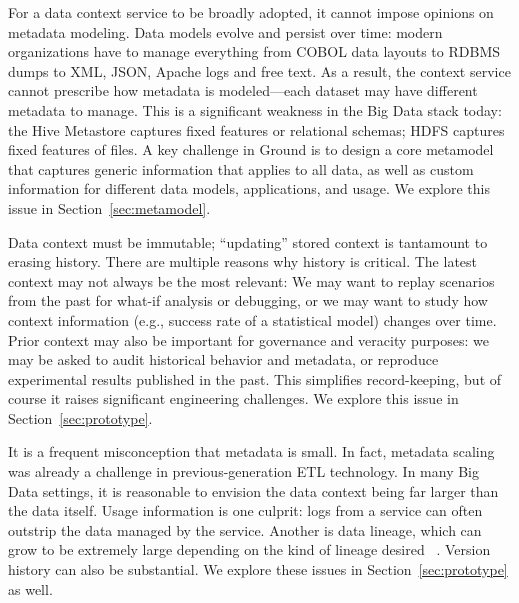 \documentclass{sig-alternate}
\begin{document}
 For a data context service to be broadly adopted, it cannot impose opinions on metadata modeling. 
Data models evolve and persist over time: modern organizations have to manage everything from COBOL data layouts to RDBMS dumps to XML, JSON, Apache logs and free text. 
As a result, the context service cannot prescribe how metadata is modeled---each dataset may have different metadata to manage. 
This is a significant weakness in the Big Data stack today: the Hive Metastore captures fixed features or relational schemas; HDFS captures fixed features of files.  
A key challenge in Ground is to design a core metamodel that captures generic information that applies to all data, as well as custom information for different data models, applications, and usage.
We explore this issue in Section~\ref{sec:metamodel}.

 Data context must be immutable; ``updating'' stored context is tantamount to erasing history. %
There are multiple reasons why history is critical. 
The latest context may not always be the most relevant: We may want to replay scenarios from the past for what-if analysis or debugging, or we may want to study how context information (e.g., success rate of a statistical model) changes over time.
Prior context may also be important for governance and veracity purposes: we may be asked to audit historical behavior and metadata, or reproduce experimental results published in the past. 
This simplifies record-keeping, but of course it raises significant engineering challenges.  
We explore this issue in Section~\ref{sec:prototype}.

 It is a frequent misconception that metadata is small. In fact, metadata scaling was already a challenge in previous-generation ETL technology. In many Big Data settings, it is reasonable to envision the data context being far larger than the data itself. Usage information is one culprit:  logs from a service can often outstrip the data managed by the service. Another is data lineage, which can grow to be extremely large
depending on the kind of lineage desired
~\cite{cheney2009provenance}.  Version history can also be substantial. 
We explore these issues in Section~\ref{sec:prototype} as well.
\end{document}
